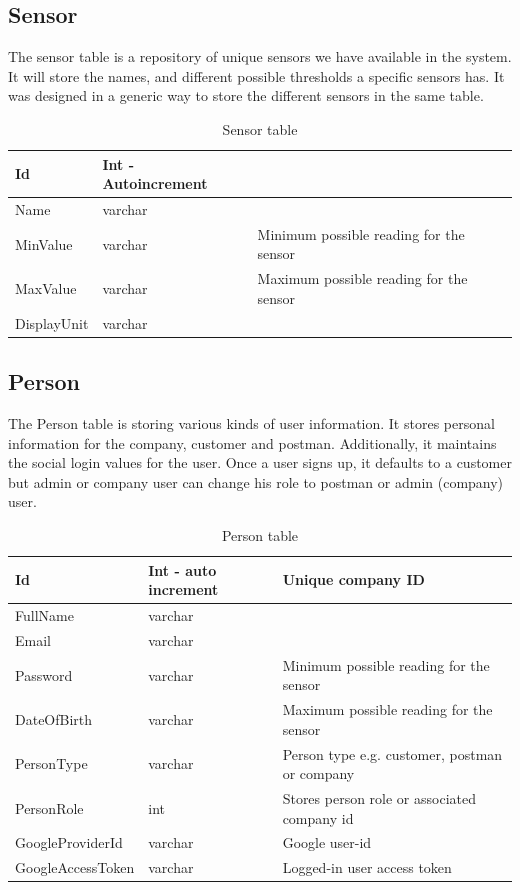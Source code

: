 \subsection{Sensor}
The sensor table is a repository of unique sensors we have available in the system. It will store the names, and different possible thresholds a specific sensors has. It was designed in a generic way to store the different sensors in the same table. 




\begin{table}[!ht]
	\small
	\centering
	\begin{tabular}{ |l|l|l| }
		\hline
		Id  & Int - Autoincrement  & \\
		\hline
		Name  & varchar & \\
		\hline
		MinValue & varchar & Minimum possible reading for the sensor  \\
		\hline
		MaxValue & varchar & Maximum possible reading for the sensor\\
		\hline
		DisplayUnit  & varchar & \\
		\hline
	\end{tabular}
	\caption{Sensor table}
\end{table}


\subsection{Person}
The Person table is storing various kinds of user information. It stores personal information for the company, customer and postman. Additionally, it maintains the social login values for the user. Once a user signs up, it defaults to a customer but admin or company user can change his role to postman or admin (company) user. 

\begin{table}[!ht]
    \begin{center}
    \begin{tabular}{ |l|l|l| } 
    \hline
    Id & Int - auto increment & Unique company ID \\
    \hline
    FullName & varchar & \\
    \hline
    Email  & varchar & \\
     \hline
    Password & varchar & Minimum possible reading for the sensor \\
     \hline
    DateOfBirth & varchar & Maximum possible reading for the sensor \\
     \hline
    PersonType & varchar & Person type e.g. customer, postman or company \\
    \hline
    PersonRole & int & Stores person role or associated company id \\
    \hline
    GoogleProviderId & varchar & Google user-id \\
    \hline
    GoogleAccessToken & varchar & Logged-in user access token\\
    \hline
    \end{tabular}
    \end{center}
    \caption{Person table}
\end{table}

